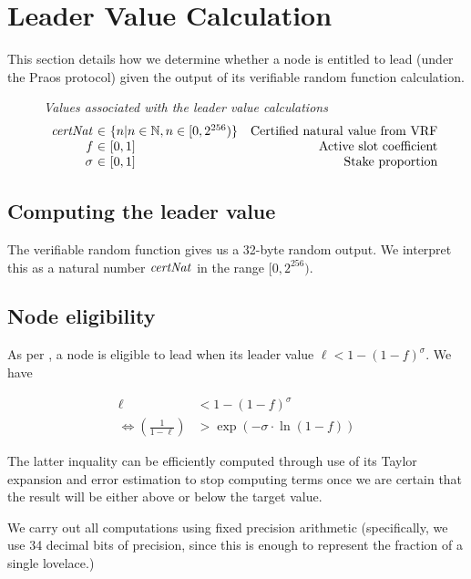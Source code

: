 \section{Leader Value Calculation}
\label{sec:leader-value-calc}

This section details how we determine whether a node is entitled to lead (under
the Praos protocol) given the output of its verifiable random function
calculation.

\begin{figure}
  \emph{Values associated with the leader value calculations}
  \begin{equation*}
  \begin{array}{r@{~\in~}lr}
    \var{certNat} & \{n | n \in \N, n \in [0,2^{256})\} & \text{Certified natural value from VRF} \\
    \var{f} & [0,1] & \text{Active slot coefficient} \\
    \sigma & [0,1] & \text{Stake proportion}
  \end{array}
  \end{equation*}
\end{figure}

\subsection{Computing the leader value}

The verifiable random function gives us a 32-byte random output. We interpret
this as a natural number $\mathit{certNat}$ in the range $[0,2^{256})$.

\subsection{Node eligibility}

As per \cite{ouroboros_praos}, a node is eligible to lead when its leader value
$\ell < 1 - (1 - f)^\sigma$. We have

\begin{align*}
  \ell & < 1 - (1 -f)^\sigma \\
  \iff \left(\frac{1}{1-\ell}\right) & > \exp{(-\sigma \cdot \ln{(1-f)})}
\end{align*}

The latter inquality can be efficiently computed through use of its Taylor
expansion and error estimation to stop computing terms once we are certain that
the result will be either above or below the target value.

We carry out all computations using fixed precision arithmetic (specifically, we
use 34 decimal bits of precision, since this is enough to represent the fraction
of a single lovelace.)

